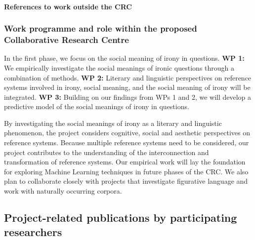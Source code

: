 \documentclass[11pt]{article}
\begin{document}
\nocite{TonhauserEtAl2013}
\nocite{TonhauserEtAl2018}
\nocite{DeMarneffeEtAl2019}
\nocite{TonhauserEtAl2012}
\nocite{DegenTonhauserMS}
\nocite{KiparskyTonhauser2013}

\paragraph{References to work outside the CRC}


\printbibliography[heading=none,keyword={TMJT-external}]

\subsubsection{Work programme and role within the proposed Collaborative Research Centre} %

\noindent
In the first phase, we focus on the social meaning of irony in questions. {\bf WP 1:} We empirically investigate the social meanings of ironic questions through a combination of methods. {\bf WP 2:} Literary and linguistic perspectives on reference systems involved in irony, social meaning, and the social meaning of irony will be integrated. {\bf WP 3:} Building on our findings from WPs 1 and 2, we will develop a predictive model of the social meanings of irony in questions.

By investigating the social meanings of irony as a literary and linguistic phenomenon, the project considers cognitive, social and aesthetic perspectives on reference systems. Because multiple reference systems need to be considered, our project contributes to the understanding of the interconnection and transformation of reference systems. Our empirical work will lay the foundation for exploring Machine Learning techniques in future phases of the CRC. We also plan to collaborate closely with projects that investigate figurative language and work with naturally occurring corpora.

\newpage
\subsection{Project-related publications by participating researchers} %

\end{document}
